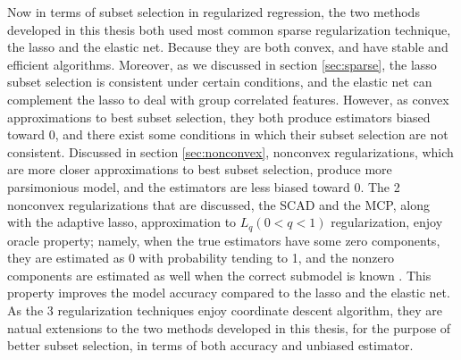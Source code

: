 Now in terms of subset selection in regularized regression, the two methods developed in this thesis both used most common sparse regularization technique, the lasso and the elastic net. Because they are both convex, and have stable and efficient algorithms. Moreover, as we discussed in section \ref{sec:sparse}, the lasso subset selection is consistent under certain conditions, and the elastic net can complement the lasso to deal with group correlated features. However, as convex approximations to best subset selection, they both produce estimators biased toward 0, and there exist some conditions in which their subset selection are not consistent. Discussed in section \ref{sec:nonconvex}, nonconvex regularizations, which are more closer approximations to best subset selection, produce more parsimonious model, and the estimators are less biased toward 0. The 2 nonconvex regularizations that are discussed, the SCAD and the MCP, along with the adaptive lasso, approximation to $L_q (0<q<1)$ regularization, enjoy oracle property; namely, when the true estimators have some zero components, they are estimated as 0 with probability tending to 1, and the nonzero components are estimated as well when the correct submodel is known \citep{fan2001variable}. This property improves the model accuracy compared to the lasso and the elastic net. As the 3 regularization techniques enjoy coordinate descent algorithm, they are natual extensions to the two methods developed in this thesis, for the purpose of better subset selection, in terms of both accuracy and unbiased estimator. 

